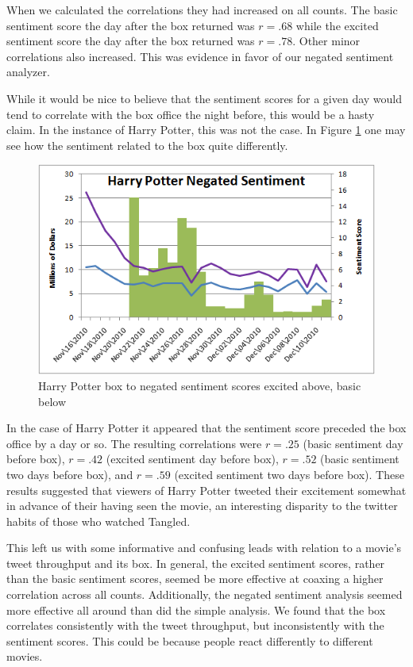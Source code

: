 \documentclass[11pt]{article}
\begin{document}
 When we calculated the correlations they had increased on all counts. The basic sentiment score the day after the box returned was $r=.68$ while the excited sentiment score the day after the box returned was $r=.78$. Other minor correlations also increased. This was evidence in favor of our negated sentiment analyzer.
 
 While it would be nice to believe that the sentiment scores for a given day would tend to correlate with the box office the night before, this would be a hasty claim. In the instance of Harry Potter, this was not the case. In Figure \ref{fig:hpsent} one may see how  the sentiment related to the box quite differently. 
 
\begin{figure}[ht!]
\centering
\includegraphics[scale=.55]{img/hpsent.png} 
\caption{Harry Potter box to negated sentiment scores excited above, basic below}
\label{fig:hpsent}
\end{figure}

In the case of Harry Potter it appeared that the sentiment score preceded the box office by a day or so. The resulting correlations were $r=.25$ (basic sentiment day before box), $r=.42$ (excited sentiment day before box), $r=.52$ (basic sentiment two days before box), and $r=.59$ (excited sentiment two days before box). These results suggested that viewers of Harry Potter tweeted their excitement somewhat in advance of their having seen the movie, an interesting disparity to the twitter habits of those who watched Tangled.

This left us with some informative and confusing leads with relation to a movie's tweet throughput and its box. In general, the excited sentiment scores, rather than the basic sentiment scores, seemed be more effective at coaxing a higher correlation across all counts. Additionally, the negated sentiment analysis seemed more effective all around than did the simple analysis. We found that the box correlates consistently with the tweet throughput, but inconsistently with the sentiment scores. This could be because people react differently to different movies. 
\end{document}
